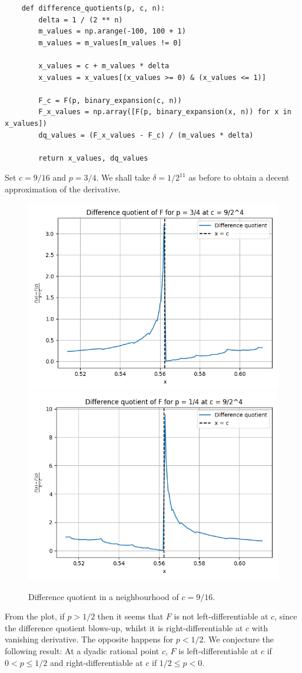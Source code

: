 \documentclass{article}
\begin{document}
\begin{verbatim}
    def difference_quotients(p, c, n):
        delta = 1 / (2 ** n)
        m_values = np.arange(-100, 100 + 1)
        m_values = m_values[m_values != 0]
        
        x_values = c + m_values * delta
        x_values = x_values[(x_values >= 0) & (x_values <= 1)]
        
        F_c = F(p, binary_expansion(c, n))
        F_x_values = np.array([F(p, binary_expansion(x, n)) for x in x_values])
        dq_values = (F_x_values - F_c) / (m_values * delta)
    
        return x_values, dq_values
\end{verbatim}

Set \(c = 9/16\) and \(p = 3/4\). We shall take \(\delta = 1 / 2^{11}\) as before to obtain a decent approximation of the derivative.

\begin{figure}
    \centering
    \includegraphics[width=0.45\linewidth]{images/derivative.png}
    \includegraphics[width=0.45\linewidth]{images/derivative_2.png}
    \caption{Difference quotient in a neighbourhood of \(c = 9/16\).}
\end{figure}

From the plot, if \(p > 1/2\) then it seems that \(F\) is not left-differentiable at \(c\), since the difference quotient blows-up, whilst it is right-differentiable at \(c\) with vanishing derivative. The opposite happens for \(p < 1/2\). We conjecture the following result: At a dyadic rational point \(c\), \(F\) is left-differentiable at \(c\) if \(0 < p \leq 1/2\) and right-differentiable at \(c\) if \(1/2 \leq p < 0\).
\end{document}
